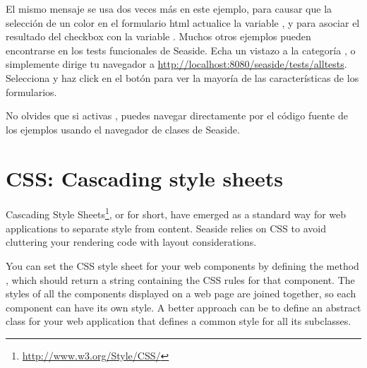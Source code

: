 \documentclass[a4paper,10pt,twoside]{book}
\begin{document}
El mismo mensaje se usa dos veces más en este ejemplo, para causar que la selección de un color en el formulario html actualice la variable , y para asociar el resultado del checkbox con la variable .
Muchos otros ejemplos pueden encontrarse en los tests funcionales de Seaside.
Echa un vistazo a la categoría , o simplemente dirige tu navegador a \url{http://localhost:8080/seaside/tests/alltests}.
Selecciona  y haz click en el botón  para ver la mayoría de las características de los formularios.

No olvides que si activas , puedes navegar directamente por el código fuente de los ejemplos usando el navegador de clases de Seaside.

\section{CSS: Cascading style sheets}


Cascading Style Sheets\footnote{\url{http://www.w3.org/Style/CSS/}}, or  for short, have emerged as a standard way for web applications to separate style from content.
Seaside relies on CSS to avoid cluttering your rendering code with layout considerations.

You can set the CSS style sheet for your web components by defining the method , which should return a string containing the CSS rules for that component.
The styles of all the components displayed on a web page are joined together, so each component can have its own style.
A better approach can be to define an abstract class for your web application that defines a common style for all its subclasses.
\end{document}
